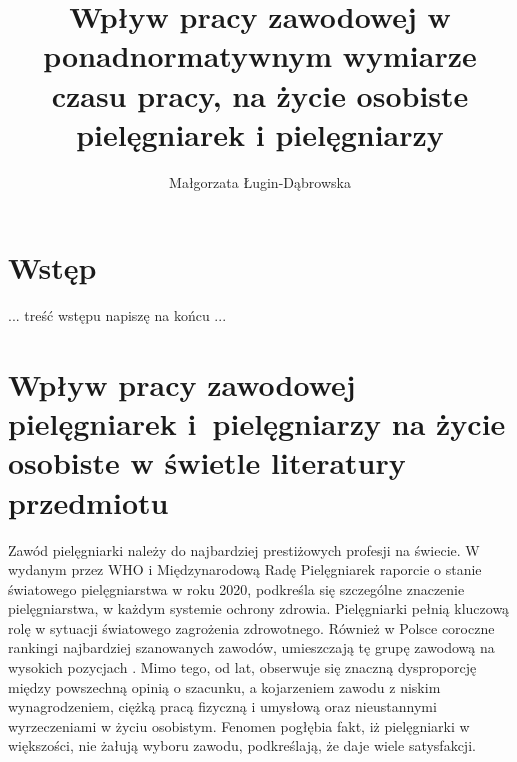 \documentclass[a4paper,12pt,twoside,openany]{report}
\title{Wpływ pracy zawodowej  w ponadnormatywnym wymiarze czasu pracy, na życie osobiste pielęgniarek i pielęgniarzy}
\author{Małgorzata Ługin-Dąbrowska}
\begin{document}
\sloppy
\maketitle


\chapter*{Wstęp}
... treść wstępu napiszę na końcu ...



\chapter{Wpływ pracy zawodowej pielęgniarek i~pielęgniarzy na życie osobiste w świetle literatury przedmiotu}
Zawód pielęgniarki należy do najbardziej prestiżowych profesji na świecie. W wydanym przez WHO i Międzynarodową Radę Pielęgniarek raporcie o stanie światowego pielęgniarstwa w roku 2020, podkreśla się szczególne znaczenie pielęgniarstwa, w każdym systemie ochrony zdrowia. Pielęgniarki pełnią kluczową rolę w sytuacji światowego zagrożenia zdrowotnego.\cite{who} Również w Polsce coroczne rankingi najbardziej szanowanych zawodów, umieszczają tę grupę zawodową na wysokich pozycjach \cite{rap}. Mimo tego, od lat, obserwuje się znaczną dysproporcję między powszechną opinią o szacunku, a kojarzeniem zawodu z niskim wynagrodzeniem, ciężką pracą fizyczną i umysłową oraz nieustannymi wyrzeczeniami w życiu osobistym. Fenomen pogłębia fakt, iż pielęgniarki w większości, nie żałują wyboru zawodu, podkreślają, że daje wiele satysfakcji.

\end{document}
